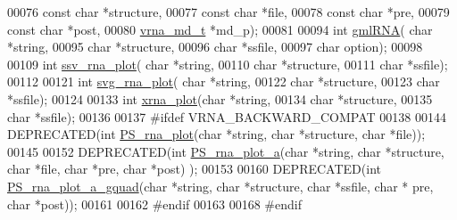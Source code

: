 \begin{DoxyCode}
00076                             \textcolor{keyword}{const} \textcolor{keywordtype}{char} *structure,
00077                             \textcolor{keyword}{const} \textcolor{keywordtype}{char} *file,
00078                             \textcolor{keyword}{const} \textcolor{keywordtype}{char} *pre,
00079                             \textcolor{keyword}{const} \textcolor{keywordtype}{char} *post,
00080                             \hyperlink{structvrna__md__s}{vrna\_md\_t}  *md\_p);
00081 
00094 \textcolor{keywordtype}{int} \hyperlink{group__plotting__utils_ga70834bc8c0aad4fe6824ff76ccb8f329}{gmlRNA}( \textcolor{keywordtype}{char} *\textcolor{keywordtype}{string},
00095             \textcolor{keywordtype}{char} *structure,
00096             \textcolor{keywordtype}{char} *ssfile,
00097             \textcolor{keywordtype}{char} option);
00098 
00109 \textcolor{keywordtype}{int} \hyperlink{group__plotting__utils_gadd368528755f9a830727b680243541df}{ssv\_rna\_plot}( \textcolor{keywordtype}{char} *\textcolor{keywordtype}{string},
00110                   \textcolor{keywordtype}{char} *structure,
00111                   \textcolor{keywordtype}{char} *ssfile);
00112 
00121 \textcolor{keywordtype}{int} \hyperlink{group__plotting__utils_gae7853539b5df98f294b4af434e979304}{svg\_rna\_plot}( \textcolor{keywordtype}{char} *\textcolor{keywordtype}{string},
00122                   \textcolor{keywordtype}{char} *structure,
00123                   \textcolor{keywordtype}{char} *ssfile);
00124 
00133 \textcolor{keywordtype}{int} \hyperlink{group__plotting__utils_ga2f6d5953e6a323df898896b8d6614483}{xrna\_plot}(\textcolor{keywordtype}{char} *\textcolor{keywordtype}{string},
00134               \textcolor{keywordtype}{char} *structure,
00135               \textcolor{keywordtype}{char} *ssfile);
00136 
00137 \textcolor{preprocessor}{#ifdef VRNA\_BACKWARD\_COMPAT}
00138 
00144 DEPRECATED(\textcolor{keywordtype}{int} \hyperlink{group__plotting__utils_ga0873c7cc4cd7a11c9a2cea19dde7e9c9}{PS\_rna\_plot}(\textcolor{keywordtype}{char} *\textcolor{keywordtype}{string}, \textcolor{keywordtype}{char} *structure, \textcolor{keywordtype}{char} *file));
00145 
00152 DEPRECATED(\textcolor{keywordtype}{int} \hyperlink{group__plotting__utils_ga47856b2504b566588785597b6ebb8271}{PS\_rna\_plot\_a}(\textcolor{keywordtype}{char} *\textcolor{keywordtype}{string}, \textcolor{keywordtype}{char} *structure, \textcolor{keywordtype}{char} *file, \textcolor{keywordtype}{char} *pre, \textcolor{keywordtype}{char} *post)
      );
00153 
00160 DEPRECATED(\textcolor{keywordtype}{int} \hyperlink{group__plotting__utils_ga32fa0f97625119e9d24dd2e7153abc4f}{PS\_rna\_plot\_a\_gquad}(\textcolor{keywordtype}{char} *\textcolor{keywordtype}{string}, \textcolor{keywordtype}{char} *structure, \textcolor{keywordtype}{char} *ssfile, \textcolor{keywordtype}{char} *
      pre, \textcolor{keywordtype}{char} *post));
00161 
00162 \textcolor{preprocessor}{#endif}
00163 
00168 \textcolor{preprocessor}{#endif}
\end{DoxyCode}
